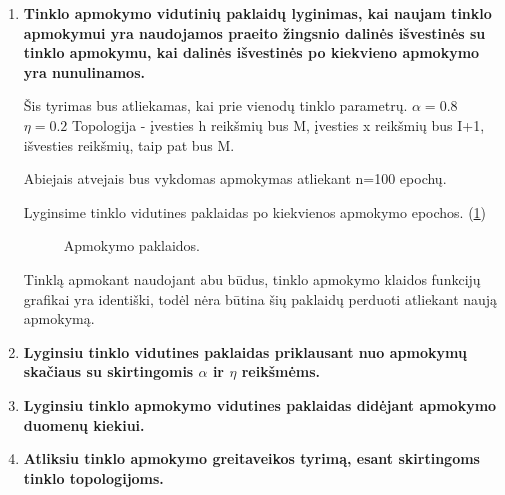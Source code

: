 \begin{enumerate}
  \item\textbf{Tinklo apmokymo vidutinių paklaidų lyginimas, kai naujam tinklo apmokymui yra naudojamos praeito žingsnio dalinės išvestinės su tinklo apmokymu, kai dalinės išvestinės po kiekvieno apmokymo yra nunulinamos.}

Šis tyrimas bus atliekamas, kai prie vienodų tinklo parametrų.
$\alpha = 0.8$
$\eta = 0.2$
Topologija - įvesties h reikšmių bus M, įvesties x reikšmių bus I+1, išvesties reikšmių, taip pat bus M.

Abiejais atvejais bus vykdomas apmokymas atliekant n=100 epochų.

Lyginsime tinklo vidutines paklaidas po kiekvienos apmokymo epochos. (\ref{fig:paklaidos1})

\begin{figure}[h!]
  \centering
{}
\caption{Apmokymo paklaidos.}
\label{fig:paklaidos1}
\end{figure}

Tinklą apmokant naudojant abu būdus, tinklo apmokymo klaidos funkcijų grafikai yra identiški, todėl nėra būtina šių paklaidų perduoti atliekant naują apmokymą.

\item \textbf{Lyginsiu tinklo vidutines paklaidas priklausant nuo apmokymų skačiaus su skirtingomis $\alpha$ ir $\eta$ reikšmėms.}


\item \textbf{Lyginsiu tinklo apmokymo vidutines paklaidas didėjant apmokymo duomenų kiekiui.}


\item \textbf{Atliksiu tinklo apmokymo greitaveikos tyrimą, esant skirtingoms tinklo topologijoms.}




\end{enumerate}

